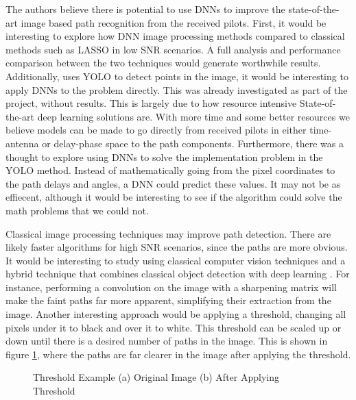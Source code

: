 The authors believe there is potential to use DNNs to improve the state-of-the-art image based path recognition from the received pilots. First, it would be interesting to explore how DNN image processing methods compared to classical methods such as LASSO in low SNR scenarios. A full analysis and performance comparison between the two techniques would generate worthwhile results. Additionally, \cite{Li2020} uses YOLO to detect points in the image, it would be interesting to apply DNNs to the problem directly. This was already investigated as part of the project, without results. This is largely due to how resource intensive State-of-the-art deep learning solutions are. With more time and some better resources we believe models can be made to go directly from received pilots in either time-antenna or delay-phase space to the path components. Furthermore, there was a thought to explore using DNNs to solve the implementation problem in the YOLO method. Instead of mathematically going from the pixel coordinates to the path delays and angles, a DNN could predict these values. It may not be as effiecent, although it would be interesting to see if the algorithm could solve the math problems that we could not.

Classical image processing techniques may improve path detection. There are likely faster algorithms for high SNR scenarios, since the paths are more obvious. It would be interesting to study using classical computer vision techniques and a hybrid technique that combines classical object detection with deep learning \cite{mahony2019}. For instance, performing a convolution on the image with a sharpening matrix will make the faint paths far more apparent, simplifying their extraction from the image. Another interesting approach would be applying a threshold, changing all pixels under it to black and over it to white. This threshold can be scaled up or down until there is a desired number of paths in the image. This is shown in figure \ref{fig:thld}, where the paths are far clearer in the image after applying the threshold. 

\begin{figure}[H]
    \caption{Threshold Example (a) Original Image (b) After Applying Threshold}
    \label{fig:thld}
\end{figure}
\noindent

